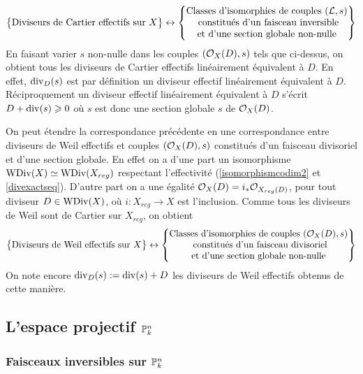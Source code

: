 $$
\left\{
\begin{matrix}
\text{Diviseurs de Cartier effectifs sur }X
\end{matrix}
\right\}
\leftrightarrow
\left\{
\begin{matrix}
\text{Classes d'isomorphies de couples }(\mathcal{L}, s)\\
\text{ constitués d'un faisceau inversible}\\
\text{et d'une section globale non-nulle}
\end{matrix}
\right\}
$$
En faisant varier $s$ non-nulle dans les couples $(\mathcal{O}_X(D),s)$ tels que ci-dessus, on obtient tous les diviseurs de Cartier effectifs linéairement équivalent à $D$. En effet, $\operatorname{div}_D(s)$ est par définition un diviseur effectif linéairement équivalent à $D$. Réciproquement un diviseur effectif linéairement équivalent à $D$ s'écrit $D+\operatorname{div}(s)\geqslant 0$ où $s$ est donc une section globale $s$ de $\mathcal{O}_X(D)$.

On peut étendre la correspondance précédente en une correspondance entre diviseurs de Weil effectifs et couples $(\mathcal{O}_X(D),s)$ constitués d'un faisceau divisoriel et d'une section globale. En effet on a d'une part un isomorphisme $\operatorname{WDiv}(X)\simeq\operatorname{WDiv}(X_{reg})$ respectant l'effectivité (\ref{isomorphismcodim2} et \ref{divexactseq}). D'autre part on a une égalité $\mathcal{O}_X(D)= i_*\mathcal{O}_{X_{reg}(D)}$, pour tout diviseur $D\in\operatorname{WDiv}(X)$, où $i:X_{reg}\rightarrow X$ est l'inclusion. Comme tous les diviseurs de Weil sont de Cartier sur $X_{reg}$, on obtient
$$
\left\{
\begin{matrix}
\text{Diviseurs de Weil effectifs sur }X
\end{matrix}
\right\}
\leftrightarrow
\left\{
\begin{matrix}
\text{Classes d'isomorphies de couples }(\mathcal{O}_X(D), s)\\
\text{ constitués d'un faisceau divisoriel}\\
\text{et d'une section globale non-nulle}
\end{matrix}
\right\}
$$
On note encore $\operatorname{div}_D(s):=\operatorname{div}(s)+D$ les diviseurs de Weil effectifs obtenus de cette manière.
\subsection{L'espace projectif $\mathbb{P}_k^n$}

\subsubsection{Faisceaux inversibles sur $\mathbb{P}_k^n$}


